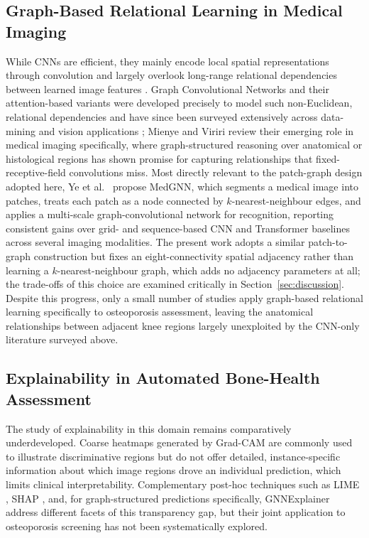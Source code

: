 \documentclass[journal]{IEEEtran}
\begin{document}
\subsection{Graph-Based Relational Learning in Medical Imaging}
While CNNs are efficient, they mainly encode local spatial representations
through convolution and largely overlook long-range relational dependencies
between learned image features \cite{Amani2024, Sarhan2024}. Graph Convolutional
Networks \cite{kipf2017semisupervised} and their attention-based variants
\cite{velickovic2018graph} were developed precisely to model such
non-Euclidean, relational dependencies and have since been surveyed extensively
across data-mining and vision applications \cite{wu2021comprehensive}; Mienye
and Viriri \cite{mienye2025graph} review their emerging role in medical imaging
specifically, where graph-structured reasoning over anatomical or histological
regions has shown promise for capturing relationships that fixed-receptive-field
convolutions miss. Most directly relevant to the patch-graph design adopted
here, Ye et al.\ \cite{ye2025medgnn} propose MedGNN, which segments a medical
image into patches, treats each patch as a node connected by
$k$-nearest-neighbour edges, and applies a multi-scale graph-convolutional
network for recognition, reporting consistent gains over grid- and
sequence-based CNN and Transformer baselines across several imaging modalities.
The present work adopts a similar patch-to-graph construction but fixes an
eight-connectivity spatial adjacency rather than learning a $k$-nearest-neighbour
graph, which adds no adjacency parameters at all; the trade-offs of this choice
are examined critically in Section~\ref{sec:discussion}. Despite this progress,
only a small number of studies apply graph-based relational learning
specifically to osteoporosis assessment, leaving the anatomical relationships
between adjacent knee regions largely unexploited by the CNN-only literature
surveyed above.

\subsection{Explainability in Automated Bone-Health Assessment}
The study of explainability in this domain remains comparatively underdeveloped.
Coarse heatmaps generated by Grad-CAM \cite{gradcam} are commonly used to
illustrate discriminative regions \cite{sukegawa2022identification, Chen2024}
but do not offer detailed, instance-specific information about which image
regions drove an individual prediction, which limits clinical interpretability.
Complementary post-hoc techniques such as LIME \cite{lime}, SHAP
\cite{lundberg2017unified}, and, for graph-structured predictions specifically,
GNNExplainer \cite{ying2019gnnexplainer} address different facets of this
transparency gap, but their joint application to osteoporosis screening has not
been systematically explored.
\end{document}
